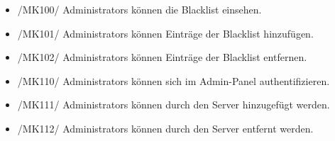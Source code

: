 \begin{itemize}
\begin{itemize}
            \item{/MK94/} \label{/MK94/}Welche \Glspl{Alias} hat das Gebäude/der Raum? \ref{/FA80/}
        \end{itemize}
    \item{/MK100/} \label{/MK100/}\Glspl{Administrator} können die \Gls{Blacklist} einsehen.
    \item{/MK101/} \label{/MK101/}\Glspl{Administrator} können Einträge der \Gls{Blacklist} hinzufügen.
    \item{/MK102/} \label{/MK102/}\Glspl{Administrator} können Einträge der \Gls{Blacklist} entfernen.
    \item{/MK110/} \label{/MK110/}\Glspl{Administrator} können sich im \Gls{Admin-Panel} authentifizieren.
    \item{/MK111/} \label{/MK111/}\Glspl{Administrator} können durch den \Gls{Server} hinzugefügt werden.
    \item{/MK112/} \label{/MK112/}\Glspl{Administrator} können durch den \Gls{Server} entfernt werden.

\end{itemize}
